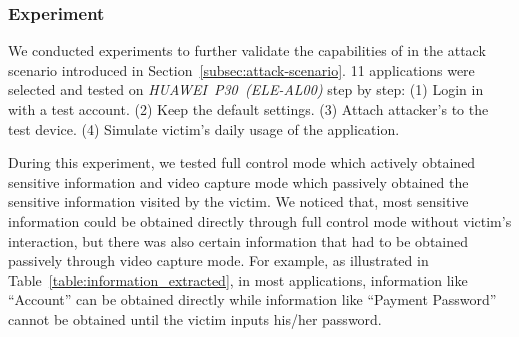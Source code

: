 \subsubsection{Experiment}

We conducted experiments to further validate the capabilities of \tool
in the attack scenario introduced in Section~\ref{subsec:attack-scenario}.
11 applications were selected and tested on \mbox{\textit{HUAWEI P30 (ELE-AL00)}} step by step:
(1) Login in with a test account.
(2) Keep the default settings.
(3) Attach attacker's \tool to the test device.
(4) Simulate victim's daily usage of the application.

During this experiment, we tested full control mode which actively obtained sensitive information and video capture mode which passively obtained the sensitive information visited by the victim. We noticed that, most sensitive information could be obtained directly through full control mode without victim's interaction, but there was also certain information that had to be obtained passively through video capture mode. For example, as illustrated in Table~\ref{table:information_extracted}, in most applications, information like ``Account'' can be obtained directly while information like ``Payment Password'' cannot be obtained until the victim inputs his/her password.

